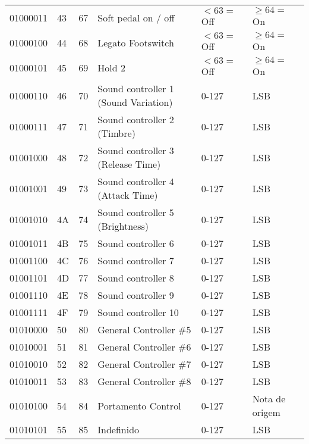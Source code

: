 \begin{center}
\begin{supertabular}{| C{2cm} | C{1.5cm} | C{1.5cm} | C{5.3cm} | C{1.5cm} | C{1.5cm} |}
                01000011 & 43 & 67  & Soft pedal on / off & $< 63 =$  Off &  $\geq 64 =$ On \\
             01000100 & 44 & 68  & Legato Footswitch & $< 63 =$  Off &  $\geq 64 =$ On \\
                01000101 & 45 & 69  & Hold 2 & $< 63 =$  Off &  $\geq 64 =$ On \\
             01000110 & 46 & 70  & Sound controller 1 (Sound Variation) & 0-127 & LSB \\
                01000111 & 47 & 71  & Sound controller 2 (Timbre) & 0-127 & LSB \\
             01001000 & 48 & 72  & Sound controller 3 (Release Time) & 0-127 & LSB \\
                01001001 & 49 & 73  & Sound controller 4 (Attack Time) & 0-127 & LSB \\
             01001010 & 4A & 74  & Sound controller 5 (Brightness) & 0-127 & LSB \\
                01001011 & 4B & 75  & Sound controller 6 & 0-127 & LSB \\
             01001100 & 4C & 76  & Sound controller 7 & 0-127 & LSB \\
                01001101 & 4D & 77  & Sound controller 8 & 0-127 & LSB \\
             01001110 & 4E & 78  & Sound controller 9 & 0-127 & LSB \\
                01001111 & 4F & 79  & Sound controller 10 & 0-127 & LSB \\
             01010000 & 50 & 80  & General Controller \#5 & 0-127 & LSB \\
                01010001 & 51 & 81  & General Controller \#6 & 0-127 & LSB \\
             01010010 & 52 & 82  & General Controller \#7 & 0-127 & LSB \\
                01010011 & 53 & 83  & General Controller \#8 & 0-127 & LSB \\
             01010100 & 54 & 84  & Portamento Control & 0-127 & Nota de origem \\
                01010101 & 55 & 85  & Indefinido & 0-127 & LSB \\

\end{supertabular}
\end{center}
